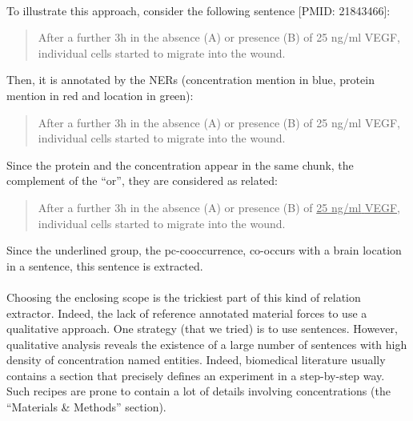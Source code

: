 \documentclass{report}
\begin{document}
		\paragraph{}To illustrate this approach, consider the following sentence [PMID: 21843466]:
		\begin{quotation}
		    After a further 3h in the absence (A) or presence (B) of 25 ng/ml VEGF, individual cells started to migrate into the wound.
		\end{quotation}
		Then, it is annotated by the NERs (concentration mention in blue, protein mention in red and location in green):
        \begin{quotation}
        After a further 3h in the absence (A) or presence (B) of {\color{blue}25 ng/ml} {\color{red}VEGF}, 
        individual {\color{ForestGreen}cells} started to migrate into the wound.
        \end{quotation}
        Since the protein and the concentration appear in the same chunk, the complement of the ``or'', they
        are considered as related:
        \begin{quotation}
        After a further 3h in the absence (A) or presence (B) of \underline{{\color{red}25 ng/ml} {\color{blue}VEGF}}, 
        individual {\color{ForestGreen}cells} started to migrate into the wound.
        \end{quotation}
        Since the underlined group, the pc-cooccurrence, co-occurs with a brain location in a sentence, this sentence
        is extracted.
        
		
		\paragraph{}Choosing the enclosing scope is the trickiest part of this kind of relation extractor. Indeed, the lack of reference annotated 
		material forces to use a qualitative approach. One strategy (that we 
		tried) is to use sentences. However, qualitative analysis reveals the 
		existence of a large 
		number of sentences with high density of concentration named entities. Indeed, biomedical literature usually contains a section 
		that precisely defines an experiment in a step-by-step way. Such recipes are prone to contain a lot of details involving concentrations (the ``Materials \& Methods'' section).
		 
\end{document}
